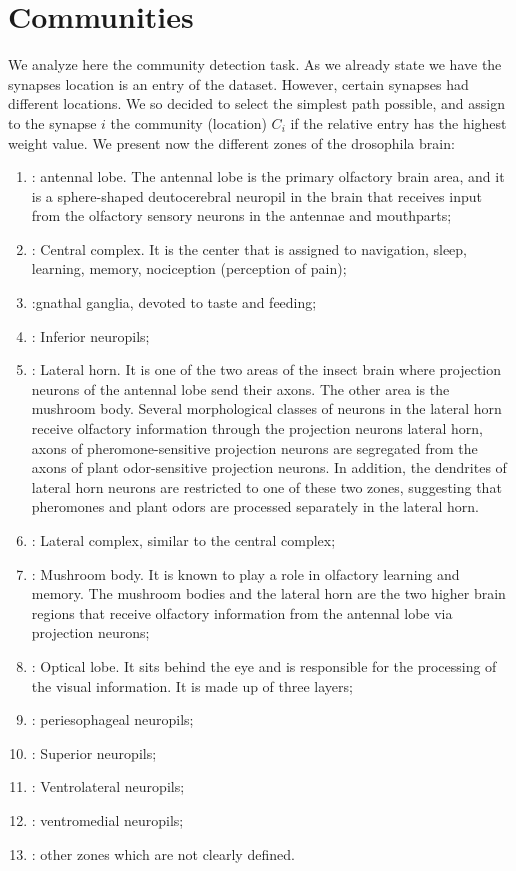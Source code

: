 \section{Communities}
We analyze here the community detection task. As we already state we have the synapses location
is an entry of the dataset. However, certain synapses had different locations. We so decided to
select the simplest path possible, and assign to the synapse $i$ the community (location) $C_i$
if the relative entry has the highest weight value. We present now the different zones of the 
drosophila brain: 
\begin{enumerate}
    \item {}: antennal lobe.
        The antennal lobe is the primary olfactory brain area, and it is a sphere-shaped 
        deutocerebral neuropil in the brain that receives input from the olfactory sensory neurons 
        in the antennae and mouthparts;
    \item {}: Central complex. It is the center that is assigned to
         navigation, sleep, learning, memory, nociception (perception of pain);
    \item {}:gnathal ganglia, devoted to taste and feeding;
    \item {}: Inferior neuropils;
    \item {}: Lateral horn. It is one of the two areas of the insect brain where projection
         neurons of the antennal lobe send their axons. The other area is the mushroom body.
         Several morphological classes of neurons in the lateral horn receive olfactory 
         information through the projection neurons lateral horn, axons of 
         pheromone-sensitive projection neurons are segregated from the axons of 
         plant odor-sensitive projection neurons. In addition, the dendrites of lateral 
         horn neurons are restricted to one of these two zones, suggesting that pheromones 
         and plant odors are processed separately in the lateral horn.
    \item {}: Lateral complex, similar to the central complex;
    \item {}: Mushroom body. It is known to play a role in olfactory learning and memory. 
         The mushroom bodies and the lateral horn are the two higher brain regions that receive 
         olfactory information from the antennal lobe via projection neurons;
    \item {}: Optical lobe. It sits behind the eye and is responsible for the processing
         of the visual information. It is made up of three layers;
    \item {}: periesophageal neuropils;
    \item {}: Superior neuropils;
    \item {}: Ventrolateral neuropils;
    \item {}: ventromedial neuropils;
    \item {}: other zones which are not clearly defined.
\end{enumerate}
